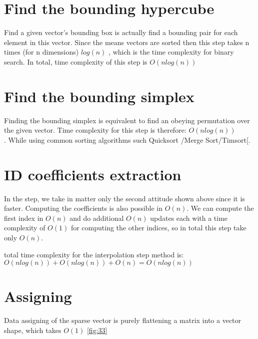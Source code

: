 \section{Find the bounding hypercube}

	Find a given vector’s bounding box is actually find a bounding pair for each element in this vector. Since the means vectors are sorted then this step takes n times (for n dimensions) $log(n)$ , which is the time complexity for binary search. In total, time complexity of this step is $O(nlog(n))$
	\break


\section{Find the bounding simplex}


Finding the bounding simplex is equivalent to find an obeying permutation over the given vector.
Time complexity for this step is therefore: $O(nlog(n))$\\. While using common sorting algorithms such Quicksort \cite{quicksort}/Merge Sort\cite{mergesort}/Timsort[\cite{timsort}.


\section{ID coefficients extraction}

In the step, we take in matter only the second attitude shown above since it is faster.
Computing the coefficients is also possible in $O(n)$.
We can compute the first index in $O(n)$ and do additional $O(n)$ updates each with a time complexity of $O(1)$ for computing the other indices, so in total this step take only $O(n)$.

total time complexity for the interpolation step method is: \\

$ O(nlog(n)) + O(nlog(n)) + O(n) = O(nlog(n)) $


\section{Assigning}

Data assigning of the sparse vector is purely flattening a matrix into a vector shape, which takes $O(1)$ \ref{fig:33}


